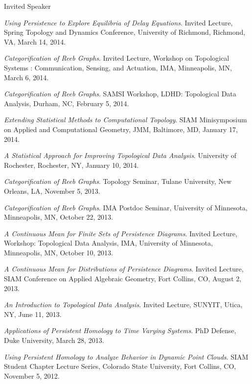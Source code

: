 \documentclass{resume} %
\begin{document}
\begin{rSection}{Invited Speaker}
\begin{etaremune}
\item\emph{Using Persistence to Explore Equilibria of Delay Equations}. Invited Lecture, Spring Topology and Dynamics Conference, University of Richmond, Richmond, VA, March 14, 2014. 

\item\emph{Categorification of Reeb Graphs}. Invited Lecture, Workshop on Topological Systems : Communication, Sensing, and Actuation, IMA, Minneapolis, MN, March 6, 2014. 

\item\emph{Categorification of Reeb Graphs}. SAMSI Workshop, LDHD: Topological Data Analysis, Durham, NC, February 5, 2014. 

\item\emph{Extending Statistical Methods to Computational Topology}. SIAM Minisymposium on Applied and Computational Geometry, JMM, Baltimore, MD, January 17, 2014. 

\item\emph{A Statistical Approach for Improving Topological Data Analysis}. University of Rochester, Rochester, NY, January 10, 2014. 

\item\emph{Categorification of Reeb Graphs}. Topology Seminar, Tulane University, New Orleans, LA, November 5, 2013. 

\item\emph{Categorification of Reeb Graphs}. IMA Postdoc Seminar, University of Minnesota, Minneapolis, MN, October 22, 2013. 

\item\emph{A Continuous Mean for Finite Sets of Persistence Diagrams}. Invited Lecture, Workshop: Topological Data Analysis, IMA, University of Minnesota, Minneapolis, MN, October 10, 2013. 

\item\emph{A Continuous Mean for Distributions of Persistence Diagrams}. Invited Lecture, SIAM Conference on Applied Algebraic Geometry, Fort Collins, CO, August 2, 2013. 

\item\emph{An Introduction to Topological Data Analysis}. Invited Lecture, SUNYIT, Utica, NY, June 11, 2013. 

\item\emph{Applications of Persistent Homology to Time Varying Systems}. PhD Defense, Duke University, March 28, 2013. 

\item\emph{Using Persistent Homology to Analyze Behavior in Dynamic Point Clouds}. SIAM Student Chapter Lecture Series, Colorado State University, Fort Collins, CO, November 5, 2012. 


\end{etaremune}
\end{rSection}
\end{document}
